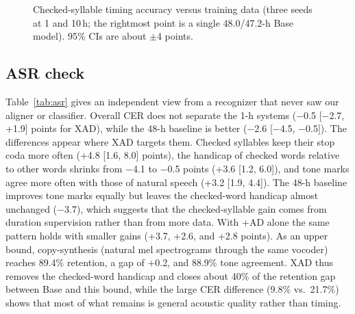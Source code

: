 \documentclass[conference,a4paper]{IEEEtran}
\begin{document}
\begin{figure}[t]
\centering
{}
\caption{Checked-syllable timing accuracy versus training data (three seeds at 1 and 10\,h; the rightmost point is a single 48.0/47.2-h Base model). 95\% CIs are about $\pm$4 points.}
\label{fig:size}
\end{figure}

\subsection{ASR check}
Table~\ref{tab:asr} gives an independent view from a recognizer that never saw our aligner or classifier. Overall CER does not separate the 1-h systems ($-$0.5 [$-$2.7, +1.9] points for XAD), while the 48-h baseline is better ($-$2.6 [$-$4.5, $-$0.5]). The differences appear where XAD targets them. Checked syllables keep their stop coda more often (+4.8 [1.6, 8.0] points), the handicap of checked words relative to other words shrinks from $-$4.1 to $-$0.5 points (+3.6 [1.2, 6.0]), and tone marks agree more often with those of natural speech (+3.2 [1.9, 4.4]). The 48-h baseline improves tone marks equally but leaves the checked-word handicap almost unchanged ($-$3.7), which suggests that the checked-syllable gain comes from duration supervision rather than from more data. With +AD alone the same pattern holds with smaller gains (+3.7, +2.6, and +2.8 points). As an upper bound, copy-synthesis (natural mel spectrograms through the same vocoder) reaches 89.4\% retention, a gap of +0.2, and 88.9\% tone agreement. XAD thus removes the checked-word handicap and closes about 40\% of the retention gap between Base and this bound, while the large CER difference (9.8\% vs.\ 21.7\%) shows that most of what remains is general acoustic quality rather than timing.
\end{document}
